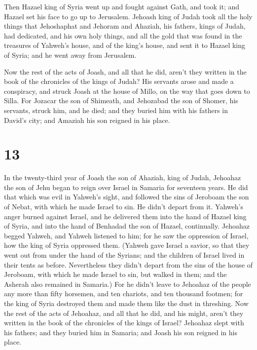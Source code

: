  Then Hazael king of Syria went up and fought against Gath,
and took it; and Hazael set his face to go up to Jerusalem.
 Jehoash king of Judah took all the holy things that
Jehoshaphat and Jehoram and Ahaziah, his fathers, kings of Judah, had
dedicated, and his own holy things, and all the gold that was found in
the treasures of Yahweh's house, and of the king's house, and sent it to
Hazael king of Syria; and he went away from Jerusalem.

 Now the rest of the acts of Joash, and all that he did,
aren't they written in the book of the chronicles of the kings of Judah?
 His servants arose and made a conspiracy, and struck Joash
at the house of Millo, on the way that goes down to Silla. 
For Jozacar the son of Shimeath, and Jehozabad the son of Shomer, his
servants, struck him, and he died; and they buried him with his fathers
in David's city; and Amaziah his son reigned in his place.

\hypertarget{section-12}{%
\section{13}\label{section-12}}

 In the twenty-third year of Joash the son of Ahaziah, king
of Judah, Jehoahaz the son of Jehu began to reign over Israel in Samaria
for seventeen years.  He did that which was evil in Yahweh's
sight, and followed the sins of Jeroboam the son of Nebat, with which he
made Israel to sin. He didn't depart from it.  Yahweh's
anger burned against Israel, and he delivered them into the hand of
Hazael king of Syria, and into the hand of Benhadad the son of Hazael,
continually.  Jehoahaz begged Yahweh, and Yahweh listened to
him; for he saw the oppression of Israel, how the king of Syria
oppressed them.  (Yahweh gave Israel a savior, so that they
went out from under the hand of the Syrians; and the children of Israel
lived in their tents as before.  Nevertheless they didn't
depart from the sins of the house of Jeroboam, with which he made Israel
to sin, but walked in them; and the Asherah also remained in Samaria.)
 For he didn't leave to Jehoahaz of the people any more than
fifty horsemen, and ten chariots, and ten thousand footmen; for the king
of Syria destroyed them and made them like the dust in threshing.
 Now the rest of the acts of Jehoahaz, and all that he did,
and his might, aren't they written in the book of the chronicles of the
kings of Israel?  Jehoahaz slept with his fathers; and they
buried him in Samaria; and Joash his son reigned in his place.

